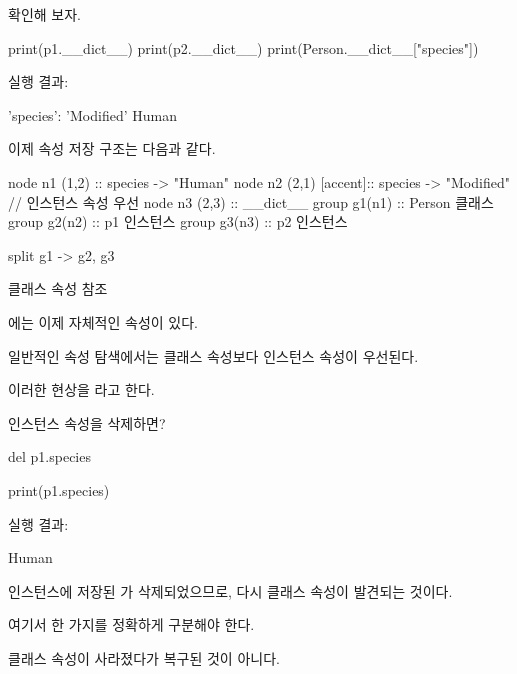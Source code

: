 확인해 보자.

\begin{dhkcode}
print(p1.__dict__)
print(p2.__dict__)
print(Person.__dict__["species"])
\end{dhkcode}

실행 결과:

\begin{dhkzsh}
{'species': 'Modified'}
{}
Human
\end{dhkzsh}

이제 속성 저장 구조는 다음과 같다.

\begin{dhkgraph}[uniform]
node n1 (1,2) :: species -> "Human"
node n2 (2,1) [accent]:: species -> "Modified" // 인스턴스 속성 우선
node n3 (2,3) :: __dict__
group g1(n1) :: Person 클래스
group g2(n2) :: p1 인스턴스
group g3(n3) :: p2 인스턴스

split g1 -> g2, g3
\end{dhkgraph}

\begin{dhknote}
\begin{dhksmry}[centered]
클래스 속성 참조
\end{dhksmry}
\end{dhknote}

에는 이제 자체적인  속성이 있다.

일반적인 속성 탐색에서는 클래스 속성보다 인스턴스 속성이 우선된다.

이러한 현상을 라고 한다.

\begin{dhknote}
\begin{dhksmry}[centered]
인스턴스 속성을 삭제하면?
\end{dhksmry}
\end{dhknote}

\begin{dhkcode}
del p1.species

print(p1.species)
\end{dhkcode}

실행 결과:

\begin{dhkzsh}
Human
\end{dhkzsh}

인스턴스에 저장된 가 삭제되었으므로, 다시 클래스 속성이 발견되는 것이다.

여기서 한 가지를 정확하게 구분해야 한다.

클래스 속성이 사라졌다가 복구된 것이 아니다.

